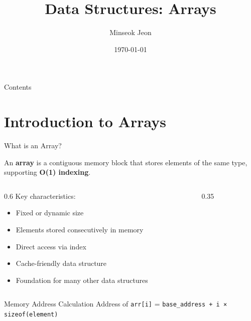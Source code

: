 \documentclass[aspectratio=169,xcolor=dvipsnames]{beamer}
\title[Arrays]{Data Structures: Arrays}
\author{Minseok Jeon}
\institute{DGIST}
\date{\today}
\begin{document}
\begin{frame}[plain]
  \titlepage
\end{frame}

\begin{frame}[plain]{Contents}
  \tableofcontents
\end{frame}

\section{Introduction to Arrays}

\begin{frame}{What is an Array?}
  \begin{definition}
    An \textbf{array} is a contiguous memory block that stores elements of the same type, supporting \textbf{O(1) indexing}.
  \end{definition}

  \vspace{0.5cm}

  \begin{columns}
    \begin{column}{0.6\textwidth}
      Key characteristics:
      \begin{itemize}
        \item Fixed or dynamic size
        \item Elements stored consecutively in memory
        \item Direct access via index
        \item Cache-friendly data structure
        \item Foundation for many other data structures
      \end{itemize}
    \end{column}
    \begin{column}{0.35\textwidth}
    \end{column}
  \end{columns}

  \vspace{0.3cm}

  \begin{alertblock}{Memory Address Calculation}
    Address of \texttt{arr[i]} = \texttt{base\_address + i × sizeof(element)}
  \end{alertblock}
\end{frame}
\end{document}
